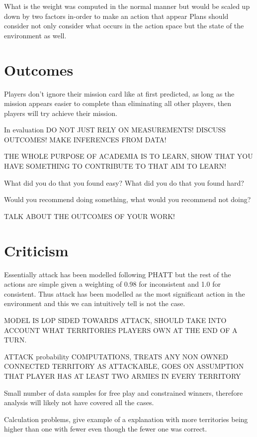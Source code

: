\documentclass[parskip]{cs4rep}
\begin{document}
What is the weight was computed in the normal manner but would be scaled up down by two factors in-order to make an action that appear
Plans should consider not only consider what occurs in the action space but the state of the environment as well.

\section{Outcomes}

Players don't ignore their mission card like at first predicted, as long as the mission appears easier to complete than eliminating all other players, then players will try achieve their mission.

In evaluation DO NOT JUST RELY ON MEASUREMENTS! DISCUSS OUTCOMES! MAKE INFERENCES FROM DATA!

THE WHOLE PURPOSE OF ACADEMIA IS TO LEARN, SHOW THAT YOU HAVE SOMETHING TO CONTRIBUTE TO THAT AIM TO LEARN!

What did you do that you found easy? What did you do that you found hard? 

Would you recommend doing something, what would you recommend not doing?

TALK ABOUT THE OUTCOMES OF YOUR WORK!

\section{Criticism}

Essentially attack has been modelled following PHATT but the rest of the actions are simple given a weighting of 0.98 for inconsistent and 1.0 for consistent. Thus attack has been modelled as the most significant action in the environment and this we can intuitively tell is not the case.

MODEL IS LOP SIDED TOWARDS ATTACK, SHOULD TAKE INTO ACCOUNT WHAT TERRITORIES PLAYERS OWN AT THE END OF A TURN.

ATTACK probability COMPUTATIONS, TREATS ANY NON OWNED CONNECTED TERRITORY AS ATTACKABLE, GOES ON ASSUMPTION THAT PLAYER HAS AT LEAST TWO ARMIES IN EVERY TERRITORY

Small number of data samples for free play and constrained winners, therefore analysis will likely not have covered all the cases.

Calculation problems, give example of a explanation with more territories being higher than one with fewer even though the fewer one was correct.
\end{document}
